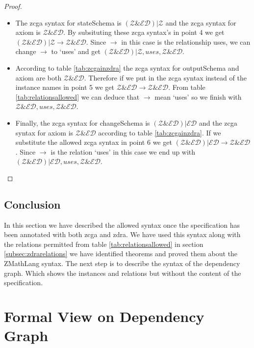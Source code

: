 \begin{proof}
\begin{itemize}
\item The \gls{zcga} syntax for stateSchema is $(\mathcal{Z} \& \mathcal{ED}) |
\mathcal{Z}$ and the \gls{zcga} syntax for axiom is  $\mathcal{Z} \&
\mathcal{ED}$. By subsituting these \gls{zcga} syntax's in point 4 we get
$(\mathcal{Z} \& \mathcal{ED}) | \mathcal{Z} \longrightarrow \mathcal{Z} \&
\mathcal{ED}$. Since $\longrightarrow$ in this case is the relationship uses, we
can change $\longrightarrow$ to `uses' and get $(\mathcal{Z} \& \mathcal{ED}) |
\mathcal{Z}, uses, \mathcal{Z} \& \mathcal{ED}$.

\item According to table \ref{tab:zcgainzdra} the \gls{zcga} syntax for
outputSchema and axiom are both $\mathcal{Z} \& \mathcal{ED}$. Therefore if we
put in the \gls{zcga} syntax instead of the instance names in point 5 we get
$\mathcal{Z} \& \mathcal{ED} \longrightarrow \mathcal{Z} \& \mathcal{ED}$. From
table \ref{tab:relationsallowed} we can deduce that $\longrightarrow$ mean
`uses' so we finish with $\mathcal{Z} \& \mathcal{ED}, uses, \mathcal{Z} \&
\mathcal{ED}$.

\item Finally, the \gls{zcga} syntax for changeSchema is $(\mathcal{Z} \&
\mathcal{ED}) | \mathcal{ED}$ and the \gls{zcga} syntax for axiom is
$\mathcal{Z} \& \mathcal{ED}$ according to table \ref{tab:zcgainzdra}. If we
substitute the allowed \gls{zcga} syntax in point 6 we get $(\mathcal{Z} \&
\mathcal{ED}) | \mathcal{ED} \longrightarrow \mathcal{Z} \& \mathcal{ED}$. Since
$\longrightarrow$ is the relation `uses' in this case we end up with
$(\mathcal{Z} \& \mathcal{ED}) | \mathcal{ED}, uses, \mathcal{Z} \&
\mathcal{ED}$.
\end{itemize}
\end{proof}

\subsection{Conclusion}
In this section we have described the allowed syntax once the specification has
been annotated with both \gls{zcga} and \gls{zdra}. We have used this syntax
along with the relations permitted from table \ref{tab:relationsallowed} in
section \ref{subsec:zdrarelations} we have identified theorems and proved them
about the ZMathLang syntax. The next step is to describe the syntax of the
dependency graph. Which shows the instances and relations but without the
content of the specification.

\section{Formal View on Dependency Graph}

